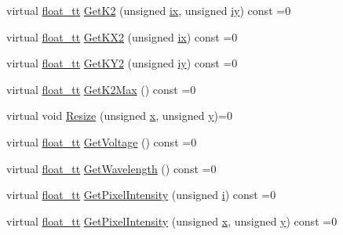 \begin{DoxyCompactItemize}
\item 
virtual \hyperlink{namespace_q_s_t_e_m_a915d7caa497280d9f927c4ce8d330e47}{float\-\_\-tt} \hyperlink{class_q_s_t_e_m_1_1_i_wave_af3c26449f65b249fa035a5bfc794d853}{Get\-K2} (unsigned \hyperlink{_display_model_properties_8m_a76b405b72b88bde9488209ac06ddb714}{ix}, unsigned \hyperlink{_display_model_properties_8m_af4c5cec9fce175f73b7da5ecd33c2af6}{iy}) const =0
\item 
virtual \hyperlink{namespace_q_s_t_e_m_a915d7caa497280d9f927c4ce8d330e47}{float\-\_\-tt} \hyperlink{class_q_s_t_e_m_1_1_i_wave_a2257271e6569857f896621d63e79e9e8}{Get\-K\-X2} (unsigned \hyperlink{_display_model_properties_8m_a76b405b72b88bde9488209ac06ddb714}{ix}) const =0
\item 
virtual \hyperlink{namespace_q_s_t_e_m_a915d7caa497280d9f927c4ce8d330e47}{float\-\_\-tt} \hyperlink{class_q_s_t_e_m_1_1_i_wave_a683ec4ff1de8987a966b4e5e3e8dc7eb}{Get\-K\-Y2} (unsigned \hyperlink{_display_model_properties_8m_af4c5cec9fce175f73b7da5ecd33c2af6}{iy}) const =0
\item 
virtual \hyperlink{namespace_q_s_t_e_m_a915d7caa497280d9f927c4ce8d330e47}{float\-\_\-tt} \hyperlink{class_q_s_t_e_m_1_1_i_wave_a2347b04a2ed0715ed78de21830011a26}{Get\-K2\-Max} () const =0
\item 
virtual void \hyperlink{class_q_s_t_e_m_1_1_i_wave_a551433f600b203549b17232ba06d4f91}{Resize} (unsigned \hyperlink{_read_d_m3___matlab_8m_a9336ebf25087d91c818ee6e9ec29f8c1}{x}, unsigned \hyperlink{qmb_8m_a2fb1c5cf58867b5bbc9a1b145a86f3a0}{y})=0
\item 
virtual \hyperlink{namespace_q_s_t_e_m_a915d7caa497280d9f927c4ce8d330e47}{float\-\_\-tt} \hyperlink{class_q_s_t_e_m_1_1_i_wave_a73458973d55046c4c86a1358a0a28bb2}{Get\-Voltage} () const =0
\item 
virtual \hyperlink{namespace_q_s_t_e_m_a915d7caa497280d9f927c4ce8d330e47}{float\-\_\-tt} \hyperlink{class_q_s_t_e_m_1_1_i_wave_af850aa1acb8a83e119f5fda16ec77bcb}{Get\-Wavelength} () const =0
\item 
virtual \hyperlink{namespace_q_s_t_e_m_a915d7caa497280d9f927c4ce8d330e47}{float\-\_\-tt} \hyperlink{class_q_s_t_e_m_1_1_i_wave_a0cf8af4aa92036d08dc7921f2da05dac}{Get\-Pixel\-Intensity} (unsigned \hyperlink{_read_d_m3___matlab_8m_a6f6ccfcf58b31cb6412107d9d5281426}{i}) const =0
\item 
virtual \hyperlink{namespace_q_s_t_e_m_a915d7caa497280d9f927c4ce8d330e47}{float\-\_\-tt} \hyperlink{class_q_s_t_e_m_1_1_i_wave_aba20bd680b82c04f4eb696ccf405d4a7}{Get\-Pixel\-Intensity} (unsigned \hyperlink{_read_d_m3___matlab_8m_a9336ebf25087d91c818ee6e9ec29f8c1}{x}, unsigned \hyperlink{qmb_8m_a2fb1c5cf58867b5bbc9a1b145a86f3a0}{y}) const =0

\end{DoxyCompactItemize}
